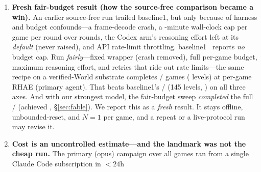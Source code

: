 \documentclass[11pt]{article}
\begin{document}
\begin{enumerate}
look inside the weights), and it touches \emph{every} frontier-model result on this benchmark, including
prior SOTA and the live leaderboard. So the strongest thing the protocol supports is \emph{no runtime
source access (audited)}, not ``no prior knowledge.'' A test free of contamination needs a model whose
cutoff provably predates a game's release---the direction of our local-model controls. This applies in
full to the \ArcFableFull/\ArcUnionGames{} Claude Fable landmark: a stronger model may have seen more, so
the milestone is best read as \emph{no runtime source access, audited}---not \emph{no prior exposure}. As
a quick check, we asked the winning model (Claude~Fable) to describe each game from its ID alone, from
memory, with no tools. It recognised \textbf{0/\ArcUnionGames{}} games---only a vague sense that ``a public
preview existed'' for three IDs, and no mechanics at all. So the model does not seem to have the games
memorised. This is a first check, not proof: we asked the model to set aside notes that were still in its
context, so a clean version---fresh context, or a model whose training provably predates each game---is the
real test.
\item \textbf{Fresh fair-budget result (how the source-free comparison became a win).} An earlier
source-free run trailed baseline1, but only because of harness and budget confounds---a frame-decode
crash, a \ArcOurBudgetMin-minute wall-clock cap per game per round over \ArcOurBudgetRounds{} rounds, the
Codex arm's reasoning effort left at its \emph{default} (never raised), and API rate-limit throttling.
baseline1~\cite{baseline1_ewm} reports \emph{no} budget cap. Run \emph{fairly}---fixed wrapper (crash
removed), full per-game budget, maximum reasoning effort, and retries that ride out rate limits---the
same recipe on a verified-World substrate completes \ArcSFGames/\ArcUnionGames{} games (\ArcSFLevels{}
levels) at \ArcRhaeSFGame{} per-game RHAE (primary agent). That beats baseline1's
\ArcBaselineFull/\ArcUnionGames{} (145 levels, \ArcRhaeBaselineOne{}) on all three axes. And with our
strongest model, the fair-budget sweep \emph{completed} the full \ArcFableFull/\ArcUnionGames{} (achieved
\ArcMilestoneUTC{}, \S\ref{sec:fable}). We report this as a \emph{fresh} result. It stays offline,
unbounded-reset, and $N{=}1$ per game, and a repeat or a live-protocol run may revise it.
\item \textbf{Cost is an uncontrolled estimate---and the landmark was not the cheap run.} The primary
(opus) campaign over all \ArcUnionGames{} games ran from a single Claude Code subscription in $<\!24$h

\end{enumerate}
\end{document}
